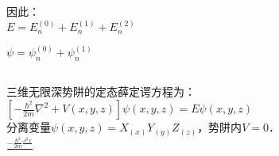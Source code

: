 因此：\\

$E = E^{(0)}_{n} + E^{(1)}_{n} + E^{(2)}_{n} $

$\psi = \psi^{(0)}_{n} + \psi^{(1)}_{n} $

\subsection{ }
三维无限深势阱的定态薛定谔方程为：\\

$\left[ -\frac{\hbar^{2}}{2m} \nabla^{2} +V(x,y,z) \right]\psi(x,y,z) = E\psi(x,y,z)$ \\

分离变量$\psi(x,y,z) = X_(x)Y_(y)Z_(z) $，势阱内$V=0$．\\

$\frac{-\frac{\hbar^{2}}{2m}\frac{\dd^{2}{x}}{}}{}$